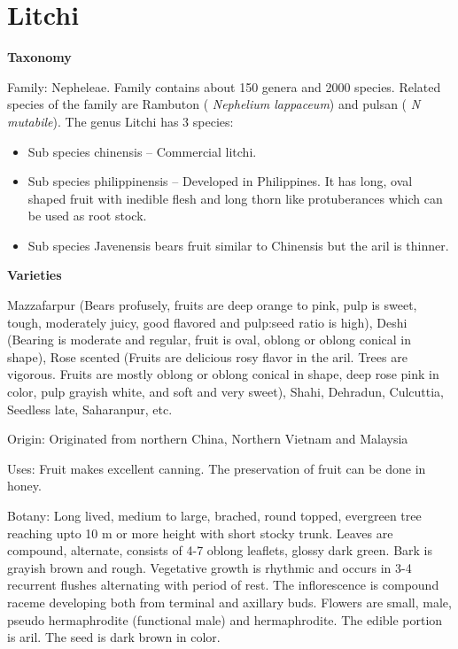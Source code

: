 \documentclass[
]{book}
\providecommand{\tightlist}{%
  \setlength{\itemsep}{0pt}\setlength{\parskip}{0pt}}
\begin{document}
\hypertarget{litchi}{%
\section{Litchi}\label{litchi}}

\textbf{Taxonomy}

Family: Nepheleae. Family contains about 150 genera and 2000 species. Related species of the family are Rambuton ( \emph{Nephelium lappaceum}) and pulsan ( \emph{N mutabile}). The genus Litchi has 3 species:

\begin{itemize}
\tightlist
\item
  Sub species chinensis -- Commercial litchi.
\item
  Sub species philippinensis -- Developed in Philippines. It has long, oval shaped fruit with inedible flesh and long thorn like protuberances which can be used as root stock.
\item
  Sub species Javenensis bears fruit similar to Chinensis but the aril is thinner.
\end{itemize}

\textbf{Varieties}

Mazzafarpur (Bears profusely, fruits are deep orange to pink, pulp is sweet, tough, moderately juicy, good flavored and pulp:seed ratio is high), Deshi (Bearing is moderate and regular, fruit is oval, oblong or oblong conical in shape), Rose scented (Fruits are delicious rosy flavor in the aril. Trees are vigorous. Fruits are mostly oblong or oblong conical in shape, deep rose pink in color, pulp grayish white, and soft and very sweet), Shahi, Dehradun, Culcuttia, Seedless late, Saharanpur, etc.

Origin: Originated from northern China, Northern Vietnam and Malaysia

Uses: Fruit makes excellent canning. The preservation of fruit can be done in honey.

Botany: Long lived, medium to large, brached, round topped, evergreen tree reaching upto 10 m or more height with short stocky trunk. Leaves are compound, alternate, consists of 4-7 oblong leaflets, glossy dark green. Bark is grayish brown and rough. Vegetative growth is rhythmic and occurs in 3-4 recurrent flushes alternating with period of rest. The inflorescence is compound raceme developing both from terminal and axillary buds. Flowers are small, male, pseudo hermaphrodite (functional male) and hermaphrodite. The edible portion is aril. The seed is dark brown in color.
\end{document}
